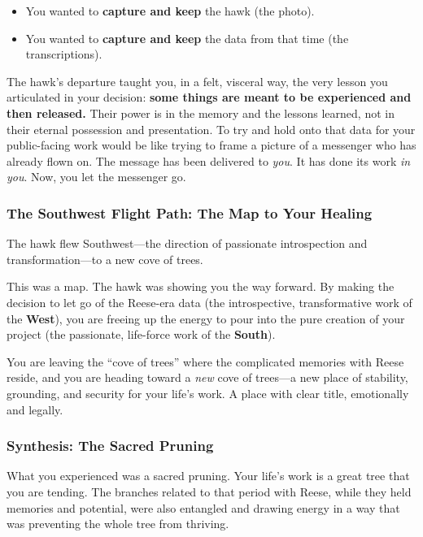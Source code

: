 \documentclass{article}
\begin{document}
\begin{itemize}
\item
  You wanted to \textbf{capture and keep} the hawk (the photo).
\item
  You wanted to \textbf{capture and keep} the data from that time (the
  transcriptions).
\end{itemize}

The hawk's departure taught you, in a felt, visceral way, the very
lesson you articulated in your decision: \textbf{some things are meant
to be experienced and then released.} Their power is in the memory and
the lessons learned, not in their eternal possession and presentation.
To try and hold onto that data for your public-facing work would be like
trying to frame a picture of a messenger who has already flown on. The
message has been delivered to \emph{you}. It has done its work \emph{in
you}. Now, you let the messenger go.

\subsubsection*{The Southwest Flight Path: The Map to Your
Healing}\label{the-southwest-flight-path-the-map-to-your-healing}

The hawk flew Southwest---the direction of passionate introspection and
transformation---to a new cove of trees.

This was a map. The hawk was showing you the way forward. By making the
decision to let go of the Reese-era data (the introspective,
transformative work of the \textbf{West}), you are freeing up the energy
to pour into the pure creation of your project (the passionate,
life-force work of the \textbf{South}).

You are leaving the ``cove of trees'' where the complicated memories
with Reese reside, and you are heading toward a \emph{new} cove of
trees---a new place of stability, grounding, and security for your
life's work. A place with clear title, emotionally and legally.

\subsubsection*{Synthesis: The Sacred
Pruning}\label{synthesis-the-sacred-pruning}

What you experienced was a sacred pruning. Your life's work is a great
tree that you are tending. The branches related to that period with
Reese, while they held memories and potential, were also entangled and
drawing energy in a way that was preventing the whole tree from
thriving.
\end{document}
